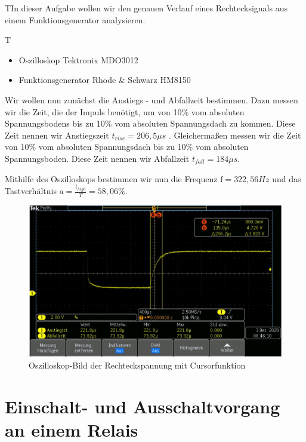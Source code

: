 \documentclass{article}
\begin{document}
\begin{task}
    TIn dieser Aufgabe wollen wir den genauen Verlauf eines Rechtecksignals aus einem Funktionsgenerator analysieren.
\end{task}
\begin{devlist}
    T\begin{itemize}
        \item Oszilloskop Tektronix MDO3012
        \item Funktionsgenerator Rhode \& Schwarz HM8150
    \end{itemize}
\end{devlist}
Wir wollen nun zunächst die Anstiegs - und Abfallzeit bestimmen. Dazu messen wir die Zeit, die der Impuls benötigt, um von 10\%
vom absoluten Spannungsbodens bis zu 10\% vom absoluten Spannungsdach zu kommen. Diese Zeit nennen wir Anstiegszeit $t_{rise}=206,5\mu s $ . Gleichermaßen
messen wir die Zeit von 10\% vom absoluten Spannungsdach bis zu 10\% vom absoluten Spannungsboden. Diese Zeit nennen wir Abfallzeit $t_{fall} = 184\mu s$.

Mithilfe des Oszilloskops bestimmen wir nun die Frequenz $\mathrm{f} = 322,56Hz$ und das Tastverhältnis $\mathrm{a} = \frac{t_{high}}{T} = 58,06\%$.

\begin{figure}[h]
    \begin{center}
        \includegraphics[scale=0.45]{../assets/images/ET2P4/aufgabe1.JPG}
        \caption{Oszilloskop-Bild der Rechteckspannung mit Cursorfunktion}
    \end{center}
\end{figure}

\newpage


\section{Einschalt- und Ausschaltvorgang an einem Relais}
\end{document}
